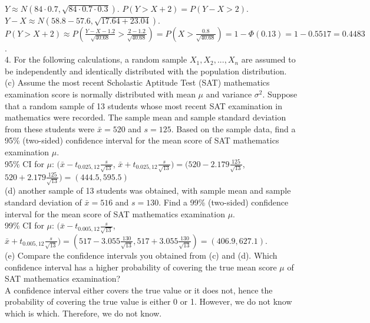 \documentclass[9pt]{article}
\begin{document}
        \\$Y\approx N(84\cdot 0.7, \sqrt{84\cdot 0.7\cdot 0.3})$. $P(Y>X+2)=P(Y-X>2)$. $Y-X\approx N(58.8-57.6,\sqrt{17.64+23.04})$. $P(Y>X+2)\approx P(\frac{Y-X-1.2}{\sqrt{40.68}}> \frac{2-1.2}{\sqrt{40.68}}) = P(X > \frac{0.8}{\sqrt{40.68}}) = 1-\Phi(0.13)=1-0.5517 = 0.4483$.\\
        4. For the following calculations, a random sample $X_1,X_2,...,X_n$ are assumed to be independently and identically distributed with the population distribution.
        \\(c) Assume the most recent Scholastic Aptitude Test (SAT) mathematics examination score is normally distributed with mean
        $\mu$ and variance $\sigma^2$. Suppose that a random sample of 13 students whose most recent SAT examination in mathematics were recorded. The sample
        mean and sample standard deviation from these students were
        $\bar{x}=520$ and $s = 125$. Based on the sample data, find a 95\% (two-sided) confidence interval for the mean score of SAT mathematics examination $\mu$.
        \\95\% CI for $\mu$: $(\bar{x}-t_{0.025,12}\frac{s}{\sqrt{13}}$, $\bar{x}+t_{0.025,12}\frac{s}{\sqrt{13}}) = (520-2.179\frac{125}{\sqrt{13}}$, $520+2.179\frac{125}{\sqrt{13}}) = (444.5, 595.5)$
        \\(d) another sample of 13 students was obtained,  with sample mean and sample standard deviation of
        $\bar{x}=516$ and $s = 130$. Find a 99\% (two-sided) confidence interval for the mean score of SAT mathematics examination $\mu$.
        \\99\% CI for $\mu$: $(\bar{x}-t_{0.005,12}\frac{s}{\sqrt{13}}$, $\bar{x}+t_{0.005,12}\frac{s}{\sqrt{13}}) = (517-3.055\frac{130}{\sqrt{13}}, 517+3.055\frac{130}{\sqrt{13}}) = (406.9, 627.1)$.
        \\(e)  Compare the confidence intervals you obtained from (c) and (d). Which confidence interval
        has a higher probability of covering the true mean score
        $\mu$ of SAT mathematics examination?
        \\A confidence interval either covers the true value or it does not, hence the probability of
        covering the true value is either 0 or 1. However, we do not know which is which. Therefore,
        we do not know.
 
\end{document}
